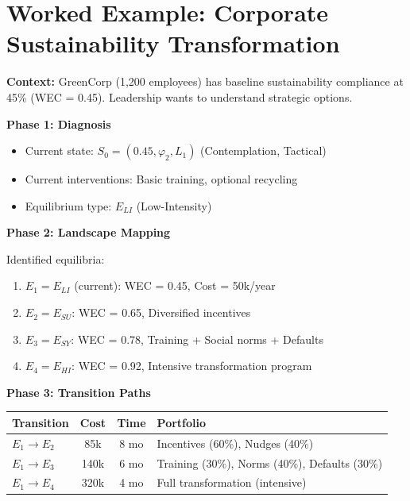 \section{Worked Example: Corporate Sustainability Transformation}
\label{sec:meq-example}

\begin{tcolorbox}[colback=gray!5!white, colframe=gray!75!black,
    title=Worked Example: GreenCorp Strategic Options]

\textbf{Context:} GreenCorp (1,200 employees) has baseline sustainability
compliance at 45\% (WEC = 0.45). Leadership wants to understand strategic options.

\textbf{Phase 1: Diagnosis}
\begin{itemize}[nosep]
    \item Current state: $S_0 = (0.45, \varphi_2, L_1)$ (Contemplation, Tactical)
    \item Current interventions: Basic training, optional recycling
    \item Equilibrium type: $E_{LI}$ (Low-Intensity)
\end{itemize}

\textbf{Phase 2: Landscape Mapping}

Identified equilibria:
\begin{enumerate}[nosep]
    \item $E_1 = E_{LI}$ (current): WEC = 0.45, Cost = 50k/year
    \item $E_2 = E_{SU}$: WEC = 0.65, Diversified incentives
    \item $E_3 = E_{SY}$: WEC = 0.78, Training + Social norms + Defaults
    \item $E_4 = E_{HI}$: WEC = 0.92, Intensive transformation program
\end{enumerate}

\textbf{Phase 3: Transition Paths}

\begin{center}
\begin{tabular}{lccl}
\textbf{Transition} & \textbf{Cost} & \textbf{Time} & \textbf{Portfolio} \\
\hline
$E_1 \to E_2$ & 85k & 8 mo & Incentives (60\%), Nudges (40\%) \\
$E_1 \to E_3$ & 140k & 6 mo & Training (30\%), Norms (40\%), Defaults (30\%) \\
$E_1 \to E_4$ & 320k & 4 mo & Full transformation (intensive) \\
\end{tabular}
\end{center}


\end{tcolorbox}
